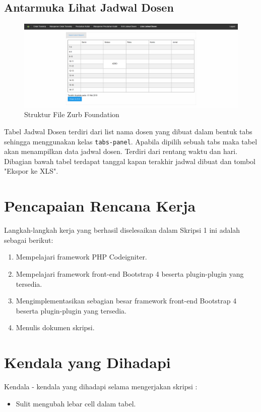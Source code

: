 \documentclass[a4paper,twoside]{article}
\begin{document}
\begin{enumerate}
		\subsection{Antarmuka Lihat Jadwal Dosen}
		\begin{figure} [H]
			\centering  
			\includegraphics[scale=0.5]{Tampilan-Lihat-Jadwal-Dosen.png}  
			\caption{Struktur File Zurb Foundation} 	
		\end{figure}
		Tabel Jadwal Dosen terdiri dari list nama dosen yang dibuat dalam bentuk tabs sehingga menggunakan kelas \texttt{tabs-panel}. Apabila dipilih sebuah tabs maka tabel akan menampilkan data jadwal dosen.  Terdiri dari rentang waktu dan hari. Dibagian bawah tabel terdapat tanggal kapan terakhir jadwal dibuat dan tombol "Ekspor ke XLS".
	\end{enumerate}
\section{Pencapaian Rencana Kerja}
Langkah-langkah kerja yang berhasil diselesaikan dalam Skripsi 1 ini adalah sebagai berikut:
\begin{enumerate}
	\item Mempelajari framework PHP Codeigniter.
	\item Mempelajari framework front-end Bootstrap 4 beserta plugin-plugin yang tersedia.
	\item Mengimplementasikan sebagian besar framework front-end Bootstrap 4 beserta plugin-plugin yang tersedia.
	\item Menulis dokumen skripsi.
\end{enumerate}

\section{Kendala yang Dihadapi}
Kendala - kendala yang dihadapi selama mengerjakan skripsi :
\begin{itemize}
	\item Sulit mengubah lebar cell dalam tabel.
\end{itemize}
\end{document}
